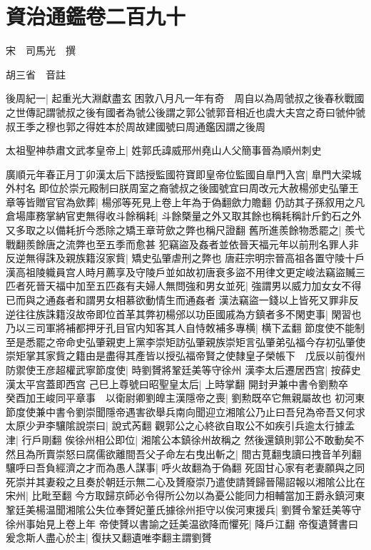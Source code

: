 \chapter{資治通鑑卷二百九十}
宋　司馬光　撰

胡三省　音註

後周紀一|{
	起重光大淵獻盡玄困敦八月凡一年有奇　周自以為周虢叔之後春秋戰國之世傳記謂虢叔之後有國者為虢公後謂之郭公虢郭音相近也虞大夫宫之奇曰虢仲虢叔王季之穆也郭之得姓本於周故建國號曰周通鑑因謂之後周}


太祖聖神恭肅文武孝皇帝上|{
	姓郭氏諱威邢州堯山人父簡事晉為順州刺史}


廣順元年春正月丁卯漢太后下誥授監國符寶即皇帝位監國自臯門入宫|{
	臯門大梁城外村名}
即位於崇元殿制曰朕周室之裔虢叔之後國號宜曰周改元大赦楊邠史弘肇王章等皆贈官官為歛葬|{
	楊邠等死見上卷上年為于偽翻歛力贍翻}
仍訪其子孫叙用之凡倉場庫務掌納官吏無得收斗餘稱耗|{
	斗餘槩量之外又取其餘也稱耗稱計斤釣石之外又多取之以備耗折今悉除之矯王章苛歛之弊也稱尺證翻}
舊所進羨餘物悉罷之|{
	羨弋戰翻羨餘唐之流弊也至五季而愈甚}
犯竊盜及姦者並依晉天福元年以前刑名罪人非反逆無得誅及親族籍沒家貲|{
	矯史弘肇虐刑之弊也}
唐莊宗明宗晉高祖各置守陵十戶漢高祖陵軄員宫人時月薦享及守陵戶並如故初唐衰多盜不用律文更定峻法竊盜贓三匹者死晉天福中加至五匹姦有夫婦人無問強和男女並死|{
	強謂男以威力加女女不得已而與之通姦者和謂男女相慕欲動情生而通姦者}
漢法竊盜一錢以上皆死又罪非反逆往往族誅籍沒故帝即位首革其弊初楊邠以功臣國戚為方鎮者多不閑吏事|{
	閑習也}
乃以三司軍將補都押牙孔目官内知客其人自恃敇補多專横|{
	横下孟翻}
節度使不能制至是悉罷之帝命史弘肇親吏上黨李崇矩訪弘肇親族崇矩言弘肇弟弘福今存初弘肇使崇矩掌其家貲之籍由是盡得其產皆以授弘福帝賢之使隸皇子榮帳下　戊辰以前復州防禦使王彦超權武寧節度使|{
	時劉贇將鞏廷美等守徐州}
漢李太后遷居西宫|{
	按薛史漢太平宫蓋即西宫}
己巳上尊號曰昭聖皇太后|{
	上時掌翻}
開封尹兼中書令劉勲卒　癸酉加王峻同平章事　以衛尉卿劉皥主漢隱帝之喪|{
	劉勲既卒它無親屬故也}
初河東節度使兼中書令劉崇聞隱帝遇害欲舉兵南向聞迎立湘隂公乃止曰吾兒為帝吾又何求太原少尹李驤隂說崇曰|{
	說式芮翻}
觀郭公之心終欲自取公不如疾引兵逾太行據孟津|{
	行戶剛翻}
俟徐州相公即位|{
	湘隂公本鎮徐州故稱之}
然後還鎮則郭公不敢動矣不然且為所賣崇怒曰腐儒欲離間吾父子命左右曳出斬之|{
	間古莧翻曳讀曰拽音羊列翻}
驤呼曰吾負經濟之才而為愚人謀事|{
	呼火故翻為于偽翻}
死固甘心家有老妻願與之同死崇并其妻殺之且奏於朝廷示無二心及贇廢崇乃遣使請贇歸晉陽詔報以湘隂公比在宋州|{
	比毗至翻}
今方取歸京師必令得所公勿以為憂公能同力相輔當加王爵永鎮河東鞏廷美楊温聞湘隂公失位奉贇妃董氏據徐州拒守以俟河東援兵|{
	劉贇令鞏廷美等守徐州事始見上卷上年}
帝使贇以書諭之廷美温欲降而懼死|{
	降戶江翻}
帝復遺贇書曰爰念斯人盡心於主|{
	復扶又翻遺唯李翻主謂劉贇}
